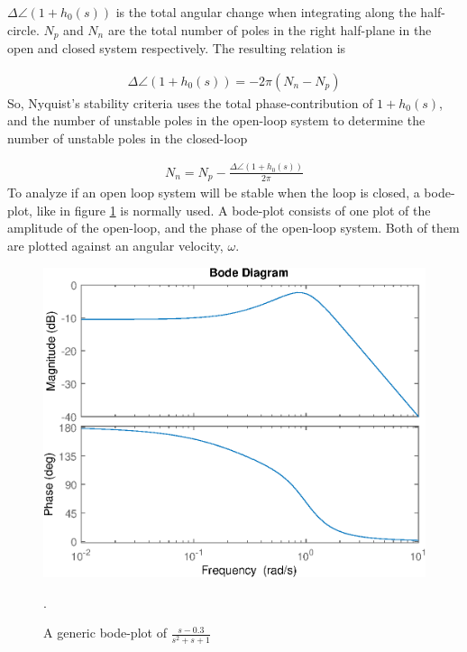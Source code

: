 \noindent
$\Delta \angle (1 + h_0(s))$ is the total angular change when integrating along the half-circle. $N_p$ and $N_n$  are the total number of poles in the right half-plane in the open and closed system respectively. The resulting relation is 

\begin{align}
    \Delta \angle (1 + h_0(s)) = - 2\pi \left( N_n- N_p \right)
\end{align}
So, Nyquist's stability criteria uses the total phase-contribution of $1+h_0(s)$, and the number of unstable poles in the open-loop system to determine the number of unstable poles in the closed-loop 

\begin{align}
    N_n = N_p - \frac{\Delta \angle (1 + h_0(s))}{2\pi} 
    \label{eq:nequist_stability_criteria}
\end{align}
\noindent
To analyze if an open loop system will be stable when the loop is closed, a bode-plot, like in figure \ref{fig:generic_bode_plot} is normally used. A bode-plot consists of one plot of the amplitude of the open-loop, and the phase of the open-loop system. Both of them are plotted against an angular velocity, $\omega$.
\begin{figure}[ht]
    \includegraphics[width=\textwidth]{img/Fig_dump/Generic_bode_plot.eps}
    \caption{A generic bode-plot of $\frac{s-0.3}{s^2 + s + 1}$}.
    \label{fig:generic_bode_plot}
\end{figure}


